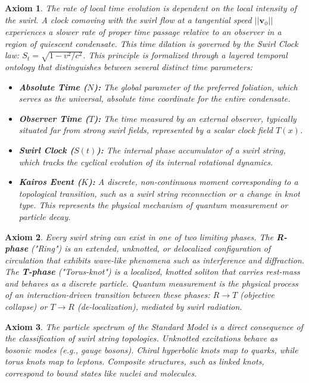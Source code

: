\documentclass[11pt]{article}
\newtheorem{axiom}{Axiom}
\begin{document}
\begin{axiom}
The rate of local time evolution is dependent on the local intensity of the swirl. A clock comoving with the swirl flow at a tangential speed $||\mathbf{v}_{\phi}||$ experiences a slower rate of proper time passage relative to an observer in a region of quiescent condensate. This time dilation is governed by the Swirl Clock law: $S_t = \sqrt{1 - v^2/c^2}$. This principle is formalized through a layered temporal ontology that distinguishes between several distinct time parameters:
\begin{itemize}
\item \textbf{Absolute Time ($N$):} The global parameter of the preferred foliation, which serves as the universal, absolute time coordinate for the entire condensate.
\item \textbf{Observer Time ($T$):} The time measured by an external observer, typically situated far from strong swirl fields, represented by a scalar clock field $T(x)$.
\item \textbf{Swirl Clock ($S(t)$):} The internal phase accumulator of a swirl string, which tracks the cyclical evolution of its internal rotational dynamics.
\item \textbf{Kairos Event ($K$):} A discrete, non-continuous moment corresponding to a topological transition, such as a swirl string reconnection or a change in knot type. This represents the physical mechanism of quantum measurement or particle decay.
\end{itemize}
\end{axiom}

\begin{axiom}
Every swirl string can exist in one of two limiting phases. The \textbf{R-phase} ("Ring") is an extended, unknotted, or delocalized configuration of circulation that exhibits wave-like phenomena such as interference and diffraction. The \textbf{T-phase} ("Torus-knot") is a localized, knotted soliton that carries rest-mass and behaves as a discrete particle. Quantum measurement is the physical process of an interaction-driven transition between these phases: $R \to T$ (objective collapse) or $T \to R$ (de-localization), mediated by swirl radiation.
\end{axiom}

\begin{axiom}
The particle spectrum of the Standard Model is a direct consequence of the classification of swirl string topologies. Unknotted excitations behave as bosonic modes (e.g., gauge bosons). Chiral hyperbolic knots map to quarks, while torus knots map to leptons. Composite structures, such as linked knots, correspond to bound states like nuclei and molecules.
\end{axiom}
\end{document}
